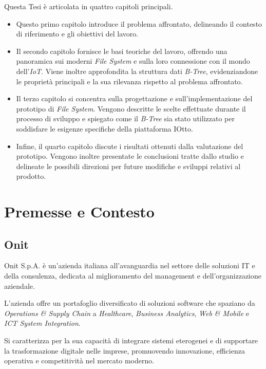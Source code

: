 \documentclass[12pt,a4paper,openright,twoside]{book}
\begin{document}
        Questa Tesi è articolata in quattro capitoli principali.

        \begin{itemize}
            \item Questo primo capitolo introduce il problema affrontato, delineando il contesto di riferimento e gli obiettivi del lavoro.
            \item Il secondo capitolo fornisce le basi teoriche del lavoro, offrendo una panoramica sui moderni \textit{File System} e sulla loro connessione con il mondo dell’\textit{IoT}. Viene inoltre approfondita la struttura dati \textit{B-Tree}, evidenziandone le proprietà principali e la sua rilevanza rispetto al problema affrontato.
            \item Il terzo capitolo si concentra sulla progettazione e sull’implementazione del prototipo di \textit{File System}. Vengono descritte le scelte effettuate durante il processo di sviluppo e spiegato come il \textit{B-Tree} sia stato utilizzato per soddisfare le esigenze specifiche della piattaforma IOtto.
            \item Infine, il quarto capitolo discute i risultati ottenuti dalla valutazione del prototipo. Vengono inoltre presentate le conclusioni tratte dallo studio e delineate le possibili direzioni per future modifiche e sviluppi relativi al prodotto.
        \end{itemize}

    \section{Premesse e Contesto}
    \label{sec:Premesse e Contesto}

        \subsection{Onit}

            Onit S.p.A. è un’azienda italiana all’avanguardia nel settore delle soluzioni IT e della consulenza, dedicata al miglioramento del management e dell’organizzazione aziendale.

            L'azienda offre un portafoglio diversificato di soluzioni software che spaziano da \textit{Operations \& Supply Chain} a \textit{Healthcare}, \textit{Business Analytics}, \textit{Web \& Mobile} e \textit{ICT System Integration}.

            Si caratterizza per la sua capacità di integrare sistemi eterogenei e di supportare la trasformazione digitale nelle imprese, promuovendo innovazione, efficienza operativa e competitività nel mercato moderno.
\end{document}
